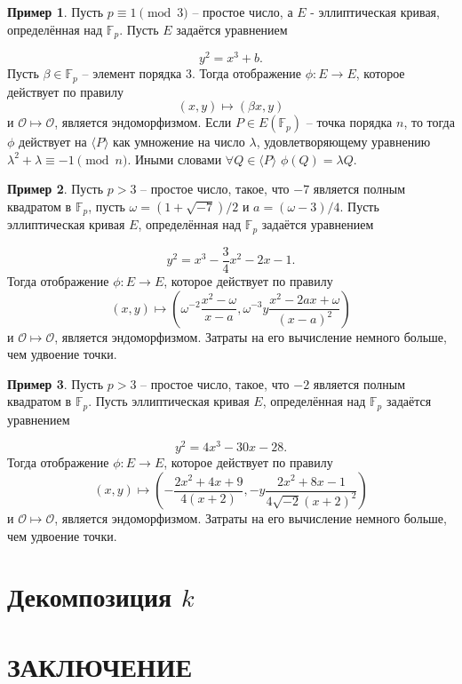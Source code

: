 \documentclass[a4paper,12pt]{article}
\theoremstyle{definition}
\theoremstyle{underline}
\newtheorem{example}{Пример}
\begin{document}
	\begin{example}
		Пусть $p \equiv 1 \pmod{3}$ -- простое число, а $E$ - эллиптическая кривая, определённая над $\mathbb{F}_p$. Пусть $E$ задаётся уравнением 
		
		\begin{equation}
			y^2 = x^3 + b.
		\end{equation}
		Пусть $\beta \in \mathbb{F}_p$ -- элемент порядка 3. Тогда отображение $\phi: E \rightarrow E$, которое действует по правилу  
		\[(x, y) \mapsto (\beta x, y)\]
		 и $\mathcal{O} \mapsto \mathcal{O}$, является эндоморфизмом. Если $P \in E(\mathbb{F}_p)$ -- точка порядка $n$, то тогда $\phi$ действует на $\langle P\rangle$ как умножение на число $\lambda$, удовлетворяющему уравнению $\lambda^2 + \lambda \equiv -1 \pmod{n}$. Иными словами $\forall Q \in \langle P\rangle$ $\phi(Q) = \lambda Q$.
		
	\end{example}

	\begin{example}
		Пусть $p>3$ -- простое число, такое, что $-7$ является полным квадратом в $\mathbb{F}_p$, пусть $\omega = (1+\sqrt{-7})/2$ и $a = (\omega - 3)/4 $. Пусть эллиптическая кривая $E$, определённая над $\mathbb{F}_p$ задаётся уравнением
	
		\begin{equation}
			y^2 = x^3 - \frac{3}{4} x^2 - 2 x - 1.
		\end{equation}
		Тогда отображение $\phi: E \rightarrow E$, которое действует по правилу 
		\[ (x, y) \mapsto \left(\omega^{-2} \frac{x^2 - \omega}{x - a}, \omega^{-3} y \frac{x^2 - 2 a x + \omega}{(x - a)^2}\right) \]
		и $\mathcal{O} \mapsto \mathcal{O}$, является эндоморфизмом. Затраты на его вычисление немного больше, чем удвоение точки.
	
	\end{example}

	\begin{example}
		Пусть $p>3$ -- простое число, такое, что $-2$ является полным квадратом в $\mathbb{F}_p$. Пусть эллиптическая кривая $E$, определённая над $\mathbb{F}_p$ задаётся уравнением
		
		\begin{equation}
			y^2 = 4x^3 -30 x - 28.
		\end{equation}
		Тогда отображение $\phi: E \rightarrow E$, которое действует по правилу 
		\[ (x, y) \mapsto \left(- \frac{2x^2 + 4x + 9}{4(x + 2)}, -y \frac{2x^2 + 8x - 1}{4 \sqrt{-2} (x + 2)^2}\right) \]
		и $\mathcal{O} \mapsto \mathcal{O}$, является эндоморфизмом. Затраты на его вычисление немного больше, чем удвоение точки.
		
	\end{example}
	
	\newpage
	\section{Декомпозиция $k$}

	\section*{ЗАКЛЮЧЕНИЕ}
	
	
	\newpage
	\printbibliography[title={БИБЛИОГРАФИЧЕСКИЙ СПИСОК}]
		
	
\end{document}

